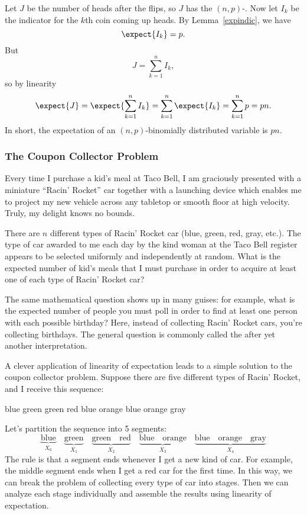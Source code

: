 Let $J$ be the number of heads after the flips, so $J$ has the
$(n,p)$-.  Now let $I_k$ be the indicator for the
$k$th coin coming up heads.  By Lemma~\ref{expindic}, we have
\[
\expect{I_k} = p.
\]
But
\[
J = \sum_{k=1}^n I_k,
\]
so by linearity
\[
\expect{J} = \expect{\sum_{k=1}^n I_k} = \sum_{k=1}^n \expect{I_k} =
\sum_{k=1}^n p = pn.
\]
In short, the expectation of an $(n,p)$-binomially distributed variable is
$pn$.


\subsubsection{The Coupon Collector Problem}

Every time I purchase a kid's meal at Taco Bell, I am graciously presented
with a miniature ``Racin' Rocket'' car together with a launching device
which enables me to project my new vehicle across any tabletop or smooth
floor at high velocity.  Truly, my delight knows no bounds.

There are $n$ different types of Racin' Rocket car (blue, green, red,
gray, etc.).  The type of car awarded to me each day by the kind woman
at the Taco Bell register appears to be selected uniformly and
independently at random.  What is the expected number of kid's meals
that I must purchase in order to acquire at least one of each type of
Racin' Rocket car?

The same mathematical question shows up in many guises: for example,
what is the expected number of people you must poll in order to find
at least one person with each possible birthday?  Here, instead of
collecting Racin' Rocket cars, you're collecting birthdays.  The
general question is commonly called the  after yet another interpretation.

A clever application of linearity of expectation leads to a simple
solution to the coupon collector problem.  Suppose there are five
different types of Racin' Rocket, and I receive this sequence:
%
\begin{center}
blue \quad green \quad green \quad red \quad blue \quad orange \quad blue \quad orange \quad gray
\end{center}
%
Let's partition the sequence into 5 segments:
%
\[
\underbrace{\text{blue}}_{X_0} \quad
\underbrace{\text{green}}_{X_1} \quad
\underbrace{\text{green} \quad \text{red}}_{X_2} \quad
\underbrace{\text{blue} \quad \text{orange}}_{X_3} \quad
\underbrace{\text{blue} \quad \text{orange} \quad \text{gray}}_{X_4}
\]
%
The rule is that a segment ends whenever I get a new kind of car.  For
example, the middle segment ends when I get a red car for the first
time.  In this way, we can break the problem of collecting every type
of car into stages.  Then we can analyze each stage individually and
assemble the results using linearity of expectation.

